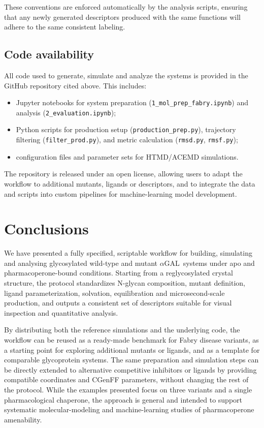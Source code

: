 \documentclass{article}
\newcommand{\agal}{$\alpha$GAL}
\begin{document}
These conventions are enforced automatically by the analysis scripts, ensuring that any newly generated descriptors produced with the same functions will adhere to the same consistent labeling.

\subsection{Code availability}

All code used to generate, simulate and analyze the systems is provided in the GitHub repository cited above.
This includes:
\begin{itemize}
    \item Jupyter notebooks for system preparation (\verb+1_mol_prep_fabry.ipynb+) and analysis (\verb+2_evaluation.ipynb+);
    \item Python scripts for production setup (\verb+production_prep.py+), trajectory filtering (\verb+filter_prod.py+), and metric calculation (\verb|rmsd.py|, \verb|rmsf.py|);
    \item configuration files and parameter sets for HTMD/ACEMD simulations.
\end{itemize}

The repository is released under an open license, allowing users to adapt the workflow to additional mutants, ligands or descriptors, and to integrate the data and scripts into custom pipelines for machine-learning model development.

\section{Conclusions}

We have presented a fully specified, scriptable workflow for building, simulating and analysing glycosylated wild-type and mutant \agal\ systems under apo and pharmacoperone-bound conditions.
Starting from a reglycosylated crystal structure, the protocol standardizes N-glycan composition, mutant definition, ligand parameterization, solvation, equilibration and microsecond-scale production, and outputs a consistent set of descriptors suitable for visual inspection and quantitative analysis.

By distributing both the reference simulations and the underlying code, the workflow can be reused as a ready-made benchmark for Fabry disease variants, as a starting point for exploring additional mutants or ligands, and as a template for comparable glycoprotein systems.
The same preparation and simulation steps can be directly extended to alternative competitive inhibitors or ligands by providing compatible coordinates and CGenFF parameters, without changing the rest of the protocol.
While the examples presented focus on three variants and a single pharmacological chaperone, the approach is general and intended to support systematic molecular-modeling and machine-learning studies of pharmacoperone amenability.
\end{document}
